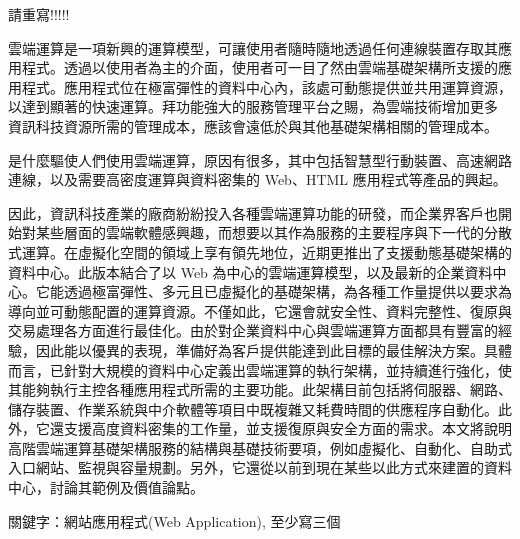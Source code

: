 請重寫!!!!!

雲端運算是一項新興的運算模型，可讓使用者隨時隨地透過任何連線裝置存取其應用程式。透過以使用者為主的介面，使用者可一目了然由雲端基礎架構所支援的應用程式。應用程式位在極富彈性的資料中心內，該處可動態提供並共用運算資源，以達到顯著的快速運算。拜功能強大的服務管理平台之賜，為雲端技術增加更多 資訊科技資源所需的管理成本，應該會遠低於與其他基礎架構相關的管理成本。

是什麼驅使人們使用雲端運算，原因有很多，其中包括智慧型行動裝置、高速網路連線，以及需要高密度運算與資料密集的 Web、HTML 應用程式等產品的興起。

因此，資訊科技產業的廠商紛紛投入各種雲端運算功能的研發，而企業界客戶也開始對某些層面的雲端軟體感興趣，而想要以其作為服務的主要程序與下一代的分散式運算。在虛擬化空間的領域上享有領先地位，近期更推出了支援動態基礎架構的資料中心。此版本結合了以 Web 為中心的雲端運算模型，以及最新的企業資料中心。它能透過極富彈性、多元且已虛擬化的基礎架構，為各種工作量提供以要求為導向並可動態配置的運算資源。不僅如此，它還會就安全性、資料完整性、復原與交易處理各方面進行最佳化。由於對企業資料中心與雲端運算方面都具有豐富的經驗，因此能以優異的表現，準備好為客戶提供能達到此目標的最佳解決方案。具體而言，已針對大規模的資料中心定義出雲端運算的執行架構，並持續進行強化，使其能夠執行主控各種應用程式所需的主要功能。此架構目前包括將伺服器、網路、儲存裝置、作業系統與中介軟體等項目中既複雜又耗費時間的供應程序自動化。此外，它還支援高度資料密集的工作量，並支援復原與安全方面的需求。本文將說明高階雲端運算基礎架構服務的結構與基礎技術要項，例如虛擬化、自動化、自助式入口網站、監視與容量規劃。另外，它還從以前到現在某些以此方式來建置的資料中心，討論其範例及價值論點。

關鍵字：網站應用程式(Web Application), 至少寫三個
